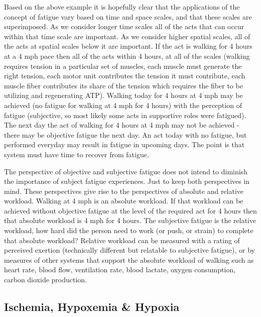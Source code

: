 Based on the above example it is hopefully clear that the applications of the concept of fatigue vary based on time and space scales, and that these scales are superimposed. As we consider longer time scales all of the acts that can occur within that time scale are important. As we consider higher spatial scales, all of the acts at spatial scales below it are important. If the act is walking for 4 hours at a 4 mph pace then all of the acts within 4 hours, at all of the scales (walking requires tension in a particular set of muscles, each muscle must generate the right tension, each motor unit contributes the tension it must contribute, each muscle fiber contributes its share of the tension which requires the fiber to be utilizing and regenerating ATP). Walking today for 4 hours at 4 mph may be achieved (no fatigue for walking at 4 mph for 4 hours) with the perception of fatigue (subjective, so most likely some acts in supportive roles were fatigued). The next day the act of walking for 4 hours at 4 mph may not be achieved - there may be objective fatigue the next day. An act today with no fatigue, but performed everyday may result in fatigue in upcoming days. The point is that system must have time to recover from fatigue.

The perspective of objective and subjective fatigue does not intend to diminish the importance of subject fatigue experiences. Just to keep both perspectives in mind. These perspectives give rise to the perspectives of absolute and relative workload. Walking at 4 mph is an absolute workload. If that workload can be achieved without objective fatigue at the level of the required act for 4 hours then that absolute workload is 4 mph for 4 hours. The subjective fatigue is the relative workload, how hard did the person need to work (or push, or strain) to complete that absolute workload? Relative workload can be measured with a rating of perceived exertion (technically different but relatable to subjective fatigue), or by measures of other systems that support the absolute workload of walking such as heart rate, blood flow, ventilation rate, blood lactate, oxygen consumption, carbon dioxide production. 


\subsection{Ischemia, Hypoxemia \& Hypoxia}


